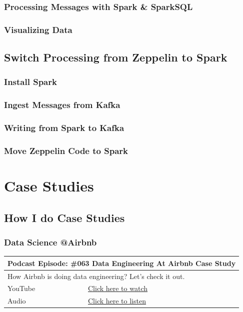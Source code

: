 \documentclass[12pt, numbers=noenddot]{scrreprt} %
\begin{document}
\section{Processing Messages with Spark \& SparkSQL}

\section{Visualizing Data}


\chapter{Switch Processing from Zeppelin to Spark}

\section{Install Spark}

\section{Ingest Messages from Kafka}

\section{Writing from Spark to Kafka}

\section{Move Zeppelin Code to Spark}

\part{Case Studies}

\chapter{How I do Case Studies}

\section{Data Science @Airbnb}

\begin{table}[h]
\begin{tabular}{ll}
\hline
\multicolumn{2}{l}{\textbf{Podcast Episode:} \#063 Data Engineering At Airbnb Case Study} \\ \hline
\multicolumn{2}{p{15cm}}{How Airbnb is doing data engineering? Let's check it out.}         \\ \hline
\multicolumn{1}{l|}{YouTube}   & \href{https://youtu.be/iokqkMfyIfo}{Click here to watch}   \\
\multicolumn{1}{l|}{Audio}     & \href{https://anchor.fm/andreaskayy/episodes/063-Data-Engineering-At-Airbnb-Case-Study-e45il2}{Click here to listen}   \\ \hline
\end{tabular}
\end{table}
\end{document}
